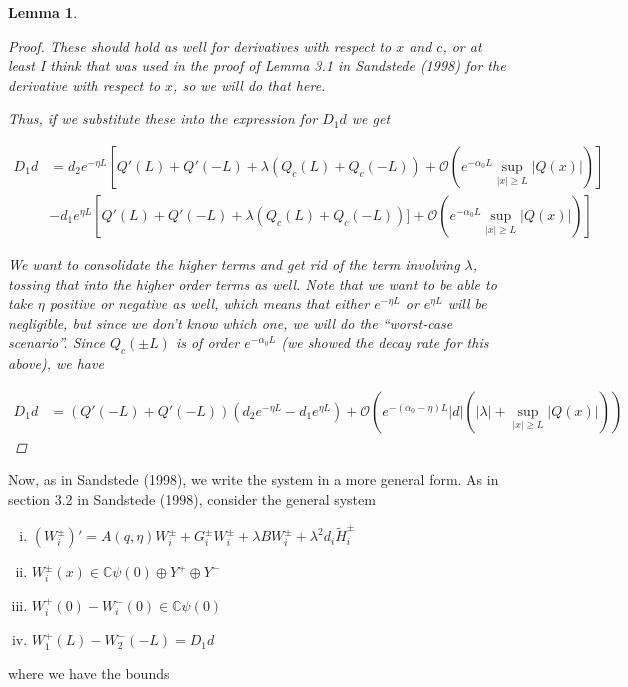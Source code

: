 \documentclass[12pt]{article}
\def\C{{\mathbb C}}
\newtheorem{lemma}{Lemma}
\begin{document}
\begin{lemma}
\begin{proof}
These should hold as well for derivatives with respect to $x$ and $c$, or at least I think that was used in the proof of Lemma 3.1 in Sandstede (1998) for the derivative with respect to $x$, so we will do that here. 

Thus, if we substitute these into the expression for $D_1 d$ we get

\begin{align*}
D_1 d &= d_2 e^{-\eta L} \left[ Q'(L) + Q'(-L) + \lambda (Q_c(L) + Q_c(-L)) + \mathcal{O} \left( e^{-\alpha_0 L} \sup_{|x| \geq L} |Q(x)| \right) \right] \\
&- d_1 e^{\eta L} \left[ Q'(L) + Q'(-L) + \lambda (Q_c(L) + Q_c(-L))] + \mathcal{O} \left( e^{-\alpha_0 L} \sup_{|x| \geq L} |Q(x)| \right) \right]
\end{align*}

We want to consolidate the higher terms and get rid of the term involving $\lambda$, tossing that into the higher order terms as well. Note that we want to be able to take $\eta$ positive or negative as well, which means that either $e^{-\eta L}$ or $e^{\eta L}$ will be negligible, but since we don't know which one, we will do the ``worst-case scenario''. Since $Q_c(\pm L)$ is of order $e^{-\alpha_0 L}$ (we showed the decay rate for this above), we have 

\begin{align*}
D_1 d &= ( Q'(-L) + Q'(-L) )(d_2 e^{-\eta L} - d_1 e^{\eta L}) + \mathcal{O} \left( e^{-(\alpha_0 - \eta) L}|d| \left( |\lambda| +  \sup_{|x| \geq L} |Q(x)| \right) \right)
\end{align*}

\end{proof}
\end{lemma}

Now, as in Sandstede (1998), we write the system in a more general form. As in section 3.2 in Sandstede (1998), consider the general system

\begin{enumerate}[(i)]
\item $(W_i^\pm)' = A(q, \eta) W_i^\pm + G_i^\pm W_i^\pm + \lambda B W_i^\pm + \lambda^2 d_i \tilde{H}_i^\pm$
\item $W_i^\pm(x) \in \C \psi(0) \oplus Y^+ \oplus Y^-$
\item $W_i^+(0) - W_i^-(0) \in \C \psi(0) $
\item $W_1^+(L) - W_2^-(-L) = D_1 d $
\end{enumerate}

where we have the bounds 
\end{document}
